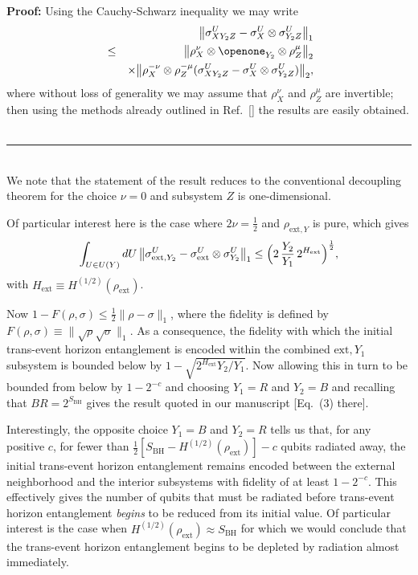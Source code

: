 \documentclass[twocolumn,aps,showpacs,prl]{revtex4}
\begin{document}
\noindent
{\bf Proof:}
Using the Cauchy-Schwarz inequality we may write
\begin{eqnarray}
&&\bigl\| \sigma_{XY_2Z}^U-
\sigma_{X}^U\otimes \sigma_{Y_2Z}^U\bigr\|_1 \\
&\le& \bigl\| \rho_{X}^{\nu}\otimes\openone_{Y_2}^{\text{~}}\otimes
\rho_{Z}^{\mu} \bigr\|_2\nonumber\\
&&\times
\bigl\| \rho_{X}^{-\nu}\otimes \rho_{Z}^{-\mu}(\sigma_{XY_2Z}^U-
\sigma_{X}^U\otimes \sigma_{Y_2Z}^U)\bigr\|_2, \nonumber
\end{eqnarray}
where without loss of generality we may assume that $\rho_{X}^{\nu}$
and $\rho_{Z}^{\mu}$ are invertible; then using the methods already
outlined in Ref.~[] the results are easily obtained.
{$~$}\hfill \rule{2mm}{2mm}\\
We note that the statement of the result reduces to the conventional
decoupling theorem for the choice $\nu=0$ and subsystem $Z$ is
one-dimensional.

Of particular interest here is the case where $2\nu=\frac{1}{2}$ and
$\rho_{\text{ext},Y}$ is pure, which gives
\begin{equation}
\int_{U\in U(Y)}dU\,\bigl\| \sigma_{\text{ext},Y_2}^U-
\sigma_{\text{ext}}^U\otimes \sigma_{Y_2}^U\bigr\|_1
\le \Bigl(2\,\frac{Y_2}{Y_1}\,2^{H_{\text{ext}}}\Bigr)^{\frac{1}{2}},
\end{equation}
with $H_{\text{ext}}\equiv H^{(1/2)}(\rho_{\text{ext}})$.

Now $1-F(\rho,\sigma) \le \frac{1}{2}\|\rho-\sigma\|_1$, where the fidelity
is defined by $F(\rho,\sigma)\equiv \|\sqrt{\rho}\sqrt{\sigma}\|_1$.
As a consequence, the fidelity with which the initial trans-event
horizon entanglement is encoded within the combined $\text{ext},Y_1$
subsystem is bounded below by $1-\sqrt{2^{H_{\text{ext}}} Y_2/Y_1}$.
Now allowing this in turn to be bounded from below by $1-2^{-c}$ and
choosing $Y_1=R$ and $Y_2=B$ and recalling that $BR=2^{S_{\text{BH}}}$
gives the result quoted in our manuscript [Eq.~(3) there].

Interestingly, the opposite choice $Y_1=B$ and $Y_2=R$ tells us that,
for any positive $c$, for fewer than
$\frac{1}{2}[S_{\text{BH}}-H^{(1/2)}(\rho_{\text{ext}})]-c$
qubits radiated away, the initial trans-event horizon entanglement
remains encoded between the external neighborhood and the interior
subsystems with fidelity of at least $1-2^{-c}$. This effectively
gives the number of qubits that must be radiated before trans-event
horizon entanglement {\it begins\/} to be reduced from its initial
value. Of particular interest is the case when
$H^{(1/2)}(\rho_{\text{ext}})\approx S_{\text{BH}}$ for which we would
conclude that the trans-event horizon entanglement begins to be
depleted by radiation almost immediately.
\end{document}
